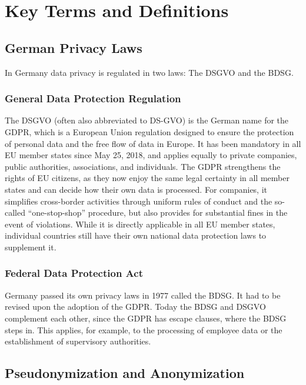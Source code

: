 \chapter{Key Terms and Definitions}
\label{chapter:key_terms_and_definitions}

\section{German Privacy Laws}

In Germany data privacy is regulated in two laws: The \ac{DSGVO} and the \ac{BDSG}.

\subsection{General Data Protection Regulation}

The \ac{DSGVO} (often also abbreviated to DS-GVO) is the German name for the \ac{GDPR}, which is a European Union regulation designed to ensure the protection of personal data and the free flow of data in Europe. It has been mandatory in all EU member states since May 25, 2018, and applies equally to private companies, public authorities, associations, and individuals. The \ac{GDPR} strengthens the rights of EU citizens, as they now enjoy the same legal certainty in all member states and can decide how their own data is processed. For companies, it simplifies cross-border activities through uniform rules of conduct and the so-called “one-stop-shop” procedure, but also provides for substantial fines in the event of violations. While it is directly applicable in all EU member states, individual countries still have their own national data protection laws to supplement it. \autocite{BFDI2025DSGVO}

\subsection{Federal Data Protection Act}

Germany passed its own privacy laws in 1977 called the \ac{BDSG}. It had to be revised upon the adoption of the \ac{GDPR}. Today the \ac{BDSG} and \ac{DSGVO} complement each other, since the \ac{GDPR} has escape clauses, where the \ac{BDSG} steps in. This applies, for example, to the processing of employee data or the establishment of supervisory authorities.
\autocite{BFDI2025DSGVO}
\autocite[68--70]{daeubler2017glaeserne}

\section{Pseudonymization and Anonymization}

